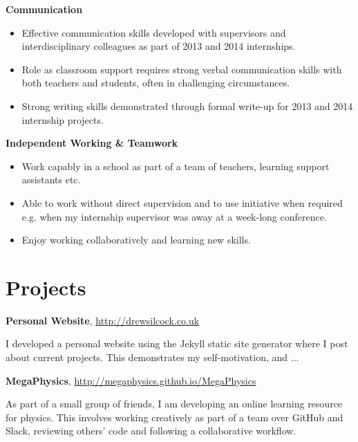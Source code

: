 \documentclass[11pt,a4paper,sans]{moderncv}
\begin{document}
\vspace{1em}

{\large\textbf{Communication}}

\begin{itemize}
\item Effective communication skills developed with supervisors and
    interdisciplinary colleagues as part of 2013 and 2014 internships.
\item Role as classroom support requires strong verbal communication skills with
    both teachers and students, often in challenging circumstances.
\item Strong writing skills demonstrated through formal write-up for 2013 and
    2014 internship projects.
\end{itemize}

\vspace{1em}

{\large\textbf{Independent Working \& Teamwork}}

\begin{itemize}
\item Work capably in a school as part of a team of teachers, learning support
    assistants etc.
\item Able to work without direct supervision and to use initiative when
    required e.g. when my internship supervisor was away at a week-long
    conference.
\item Enjoy working collaboratively and learning new skills.
\end{itemize}

\section{Projects}

{\large\textbf{Personal Website}, \color{blue}
\href{http://drewsilcock.co.uk}{http://drewsilcock.co.uk}}

I developed a personal website using the Jekyll static site generator where I
post about current projects. This demonstrates my self-motivation, and ...

\vspace{0.75em}

{\large\textbf{MegaPhysics}, \color{blue}
\href{http://megaphysics.github.io/MegaPhysics}{http://megaphysics.github.io/MegaPhysics}}

As part of a small group of friends, I am developing an online learning resource
for physics. This involves working creatively as part of a team over GitHub and
Slack, reviewing others' code and following a collaborative workflow.
\end{document}
